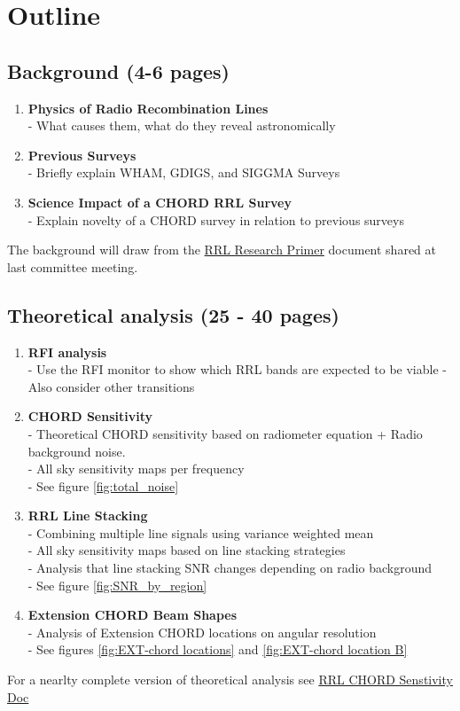 \section{Outline}
\subsection{Background (4-6 pages)}
\begin{enumerate}
    \item \textbf{Physics of Radio Recombination Lines} \\
    - What causes them, what do they reveal astronomically
    
    \item \textbf{Previous Surveys}\\
    - Briefly explain WHAM, GDIGS, and SIGGMA Surveys
    
    \item \textbf{Science Impact of a CHORD RRL Survey}\\
    - Explain novelty of a CHORD survey in relation to previous surveys
\end{enumerate}

The background will draw from the \href{https://www.overleaf.com/read/dshhtymzxprq#bbbc27}{RRL Research Primer} document shared at last committee meeting.

\subsection{Theoretical analysis (25 - 40 pages)}
\begin{enumerate}
    \item \textbf{RFI analysis}\\
    - Use the RFI monitor to show which RRL bands are expected to be viable
    - Also consider other transitions
    \item \textbf{CHORD Sensitivity} \\
    - Theoretical CHORD sensitivity based on radiometer equation + Radio background noise.\\
    - All sky sensitivity maps per frequency\\
    - See figure \ref{fig:total_noise}
    \item \textbf{RRL Line Stacking}\\
    - Combining multiple line signals using variance weighted mean\\
    - All sky sensitivity maps based on line stacking strategies\\
    - Analysis that line stacking SNR changes depending on radio background \\
    - See figure \ref{fig:SNR_by_region}
    \item \textbf{Extension CHORD Beam Shapes}\\
    - Analysis of Extension CHORD locations on angular resolution\\
    - See figures \ref{fig:EXT-chord locations} and \ref{fig:EXT-chord location B}
\end{enumerate}
For a nearlty complete version of theoretical analysis see \href{https://www.overleaf.com/project/690bf7f099630fb66b636329}{RRL CHORD Senstivity Doc}

